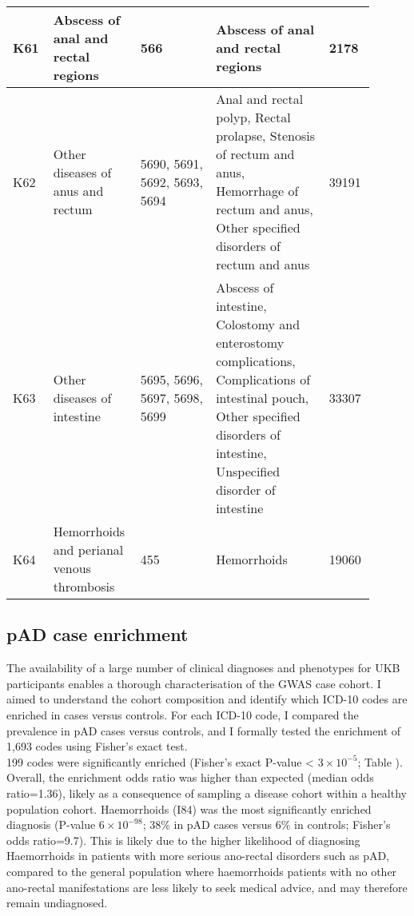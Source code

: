 \begin{table}[]
\begin{tabular}{|p{0.1\linewidth}|p{0.2\linewidth}|p{0.2\linewidth}|p{0.3\linewidth}|p{0.1\linewidth}|}
  K61         & Abscess of anal and rectal regions                        & 566                                 & Abscess of anal and rectal regions              &     2178                                                                                                                        \\ \hline
  K62         & Other diseases of anus and rectum                         & 5690, 5691, 5692, 5693, 5694            & Anal and rectal polyp, Rectal prolapse, Stenosis of rectum and anus, Hemorrhage of rectum and anus, Other specified disorders of rectum and anus            & 39191                \\ \hline
  K63         & Other diseases of intestine                               & 5695, 5696, 5697, 5698, 5699            & Abscess of intestine, Colostomy and enterostomy complications, Complications of intestinal pouch, Other specified disorders of intestine, Unspecified disorder of intestine & 33307 \\ \hline
  K64         & Hemorrhoids and perianal venous thrombosis                & 455                                 & Hemorrhoids & 19060\\ \hline

  \end{tabular}
  \end{table}
  \subsection{pAD case enrichment}
  The availability of a large number of clinical diagnoses and phenotypes for UKB participants enables a thorough characterisation of the GWAS case cohort. I aimed to understand the cohort composition and identify which ICD-10 codes are enriched in cases versus controls. For each ICD-10 code, I compared the prevalence in pAD cases versus controls, and I formally tested the enrichment of 1,693 codes using Fisher's exact test. \\

  199 codes were significantly enriched (Fisher’s exact  P-value < $3\times10^{-5}$; Table ). Overall, the enrichment odds ratio was higher than expected (median odds ratio=1.36), likely as a consequence of sampling a disease cohort within a healthy population cohort. Haemorrhoids (I84) was the most significantly enriched diagnosis (P-value $6\times10^{-98}$; 38\% in pAD cases versus 6\% in controls; Fisher's odds ratio=9.7). This is likely due to the higher likelihood of diagnosing Haemorrhoids in patients with more serious ano-rectal disorders such as pAD, compared to the general population where haemorrhoids patients with no other ano-rectal manifestations are less likely to seek medical advice, and may therefore remain undiagnosed. 



